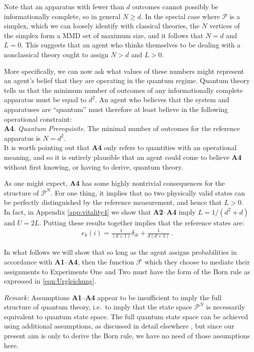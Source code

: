 \documentclass[%
 reprint,superscriptaddress,
 amsmath,amssymb,
 aps,twocolumn,pra
]{revtex4-1}
\newcommand{\eqn}[1]{\begin{eqnarray} #1 \end{eqnarray}}
\newcommand{\tit}[1]{\textit{#1}}
\newcommand{\onestage}{{One}}
\newcommand{\twostage}{{Two}}
\begin{document}
Note that an apparatus with fewer than $d$ outcomes cannot possibly be informationally complete, so in general $N \geq d$. In the special case where $\mathcal{P}$ is a simplex, which we can loosely identify with classical theories, the $N$ vertices of the simplex form a MMD set of maximum size, and it follows that $N=d$ and $L=0$. This suggests that an agent who thinks themselves to be dealing with a nonclassical theory ought to assign $N > d$ and $L > 0$.

More specifically, we can now ask what values of these numbers might represent an agent's belief that they are operating in the quantum regime. Quantum theory tells us that the minimum number of outcomes of any informationally complete apparatus must be equal to $d^2$. An agent who believes that the system and apparatuses are ``quantum'' must therefore at least believe in the following operational constraint: \\

{\bf A4}. \tit{Quantum Prerequisite}. The minimal number of outcomes for the reference apparatus is $N=d^2$.\\

It is worth pointing out that {\bf A4} only refers to quantities with an operational meaning, and so it is entirely plausible that an agent could come to believe {\bf A4} without first knowing, or having to derive, quantum theory.

As one might expect, {\bf A4} has some highly nontrivial consequences for the structure of $\mathcal{P}^N$. For one thing, it implies that no two physically valid states can be perfectly distinguished by the reference measurement, and hence that $L>0$. In fact, in Appendix \ref{app:vitality4} we show that {\bf A2}--{\bf A4} imply $L = 1/(d^2+d)$ and $U = 2L$. Putting these results together implies that the reference states are:
\eqn{ \label{eqn:e_components}
e_k(i) = \frac{1}{(d+1)}\delta_{ik} + \frac{1}{d(d+1)} \, .
}

In what follows we will show that so long as the agent assigns probabilities in accordance with {\bf A1}--{\bf A4}, then the function $\mathcal{F}$ which they choose to mediate their assignments to Experiments \onestage{} and \twostage{} must have the form of the Born rule as expressed in \eqref{eqn:Urgleichung}.

\tit{Remark:} Assumptions {\bf A1}--{\bf A4} appear to be insufficient to imply the full structure of quantum theory, i.e.\ to imply that the state space $\mathcal{P}^N$ is necessarily equivalent to quantum state space. The full quantum state space can be achieved using additional assumptions, as discussed in detail elsewhere \cite{QPLEX}, but since our present aim is only to derive the Born rule, we have no need of those assumptions here.
\end{document}
